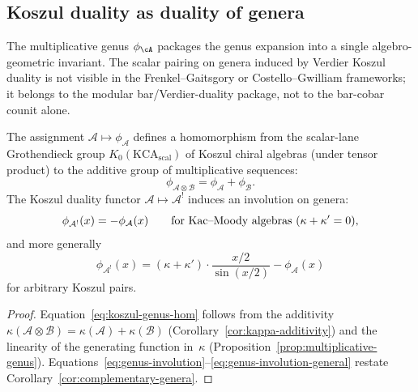 \subsection{Koszul duality as duality of genera}\label{subsec:koszul-genera-duality}

The multiplicative genus $\phi_{\cA}$ packages the genus expansion
into a single algebro-geometric invariant. The scalar pairing on
genera induced by Verdier Koszul duality is not visible in the
Frenkel--Gaitsgory or Costello--Gwilliam frameworks; it belongs to
the modular bar/Verdier-duality package, not to the bar-cobar counit
alone.

\begin{proposition}
\label{prop:koszul-genus-involution}
The assignment $\mathcal{A} \mapsto \phi_{\mathcal{A}}$ defines a homomorphism
from the scalar-lane Grothendieck group $K_0(\mathrm{KCA}_{\mathrm{scal}})$
of Koszul chiral algebras
\textup{(}under tensor product\textup{)} to the additive group of multiplicative
sequences:
\begin{equation}\label{eq:koszul-genus-hom}
\phi_{\mathcal{A} \otimes \mathcal{B}} = \phi_{\mathcal{A}} + \phi_{\mathcal{B}}.
\end{equation}
The Koszul duality functor $\mathcal{A} \mapsto \mathcal{A}^!$ induces an
involution on genera:
\begin{equation}\label{eq:genus-involution}
\phi_{\mathcal{A}^!}(x) = -\phi_{\mathcal{A}}(x)
\qquad\text{for Kac--Moody algebras \textup{(}$\kappa + \kappa' = 0$\textup{)}},
\end{equation}
and more generally
\begin{equation}\label{eq:genus-involution-general}
\phi_{\mathcal{A}^!}(x) = (\kappa + \kappa') \cdot \frac{x/2}{\sin(x/2)} - \phi_{\mathcal{A}}(x)
\end{equation}
for arbitrary Koszul pairs.
\end{proposition}

\begin{proof}
Equation~\eqref{eq:koszul-genus-hom} follows from the additivity
$\kappa(\mathcal{A} \otimes \mathcal{B}) = \kappa(\mathcal{A}) + \kappa(\mathcal{B})$
(Corollary~\ref{cor:kappa-additivity}) and the linearity of the generating
function in~$\kappa$ (Proposition~\ref{prop:multiplicative-genus}).
Equations~\eqref{eq:genus-involution}--\eqref{eq:genus-involution-general}
restate Corollary~\ref{cor:complementary-genera}.
\end{proof}

